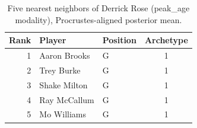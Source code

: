 \begin{table}[htbp]
  \centering\small
  \begin{tabular}{rllc}
    \toprule
    Rank & Player & Position & Archetype \\
    \midrule
    1 & Aaron Brooks & G & 1 \\
    2 & Trey Burke & G & 1 \\
    3 & Shake Milton & G & 1 \\
    4 & Ray McCallum & G & 1 \\
    5 & Mo Williams & G & 1 \\
    \bottomrule
  \end{tabular}
  \caption{Five nearest neighbors of Derrick Rose (peak_age modality), Procrustes-aligned posterior mean.}
  \label{tab:Derrick_Rose_neighbors_peak_age}
\end{table}

